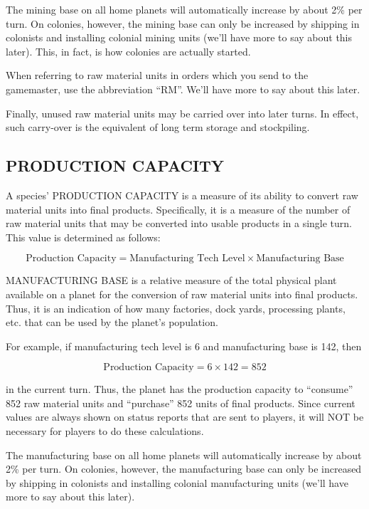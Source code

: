 \documentclass[10pt,titlepage]{article}
\begin{document}
The mining base on all home planets will automatically increase by about 2\% per
turn.  On colonies, however, the mining base can only be increased by shipping
in colonists and installing colonial mining units (we'll have more to say about
this later).  This, in fact, is how colonies are actually started.

When referring to raw material units in orders which you send to the
gamemaster, use the abbreviation ``RM''.  We'll have more to say about this
later.

Finally, unused raw material units may be carried over into later turns.  In
effect, such carry-over is the equivalent of long term storage and stockpiling.


\subsection{PRODUCTION CAPACITY}
\label{sec:productioncapacity}


A species' PRODUCTION CAPACITY is a measure of its ability to convert raw
material units into final products.  Specifically, it is a measure of the
number of raw material units that may be converted into usable products in
a single turn.  This value is determined as follows:

\begin{equation*}
  \textrm{Production Capacity}  =  \textrm{Manufacturing Tech Level}  \times  \textrm{Manufacturing Base}
\end{equation*}

MANUFACTURING BASE is a relative measure of the total physical plant available
on a planet for the conversion of raw material units into final products.
Thus, it is an indication of how many factories, dock yards, processing plants,
etc. that can be used by the planet's population.

For example, if manufacturing tech level is 6 and manufacturing base is 142,
then

\begin{equation*}
	\textrm{Production Capacity}  =  6  \times  142  =  852
\end{equation*}

in the current turn.  Thus, the planet has the production capacity to ``consume''
852 raw material units and ``purchase'' 852 units of final products.  Since
current values are always shown on status reports that are sent to players,
it will NOT be necessary for players to do these calculations.

The manufacturing base on all home planets will automatically increase by
about 2\% per turn.  On colonies, however, the manufacturing base can only be
increased by shipping in colonists and installing colonial manufacturing units
(we'll have more to say about this later).
\end{document}
